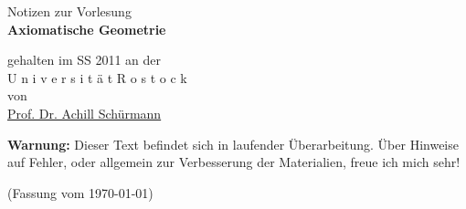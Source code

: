 \thispagestyle{empty}
\vspace*{3cm}

\begin{center}
	{\Large Notizen zur Vorlesung\\}
	\vspace{1cm}
	{\LARGE{\bf Axiomatische Geometrie}\\}
	\vspace{1.5cm}

{\Large
   gehalten im SS 2011 an der \\[1cm]
     U n i v e r s i t ä t  \quad  R o s t o c k\\[1cm]
   von \\[1cm]
    \href{http://www.geometrie.uni-rostock.de/}{Prof. Dr. Achill Schürmann}\\[1cm]
}
\end{center}

\vspace{4cm}

\noindent
{\bf Warnung:} Dieser Text befindet sich in laufender Überarbeitung.
Über Hinweise auf Fehler, oder allgemein zur Verbesserung der Materialien, freue ich mich sehr!

\vspace{2cm} 

\noindent

(Fassung vom \today)






